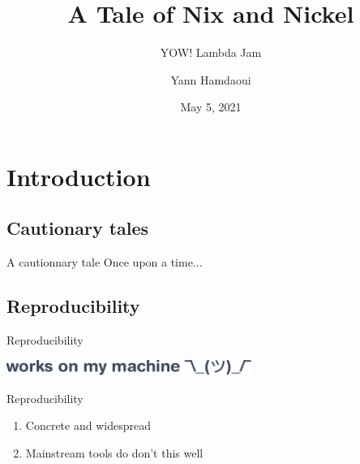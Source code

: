 \documentclass[t, aspectratio=169]{beamer}
\author{Yann Hamdaoui}
\title{A Tale of Nix and Nickel}
\subtitle{YOW! Lambda Jam}
\date{May 5, 2021}
\begin{document}

\newenvironment{frcseries}{\fontfamily{frc}\selectfont}{}
\newcommand{\textfrc}[1]{{\frcseries#1}}

\begin{frame}
\titlepage
\end{frame}

\section{Introduction}

\subsection{Cautionary tales}

\begin{frame}{A cautionnary tale}
Once upon a time...
\end{frame}

\subsection{Reproducibility}

\begin{frame}{Reproducibility}
    \begin{center}
        \includegraphics[width=0.6\textwidth]{img/works-on-my-machine.pdf}
    \end{center}

    \vspace{10pt}

     {
    \begin{alertblock}{Reproducibility}
    \begin{enumerate}
        \item<3-> Concrete and widespread
        \item<4-> Mainstream tools do don't this well
    \end{enumerate}
    \end{alertblock}
}
\end{frame}
\end{document}
